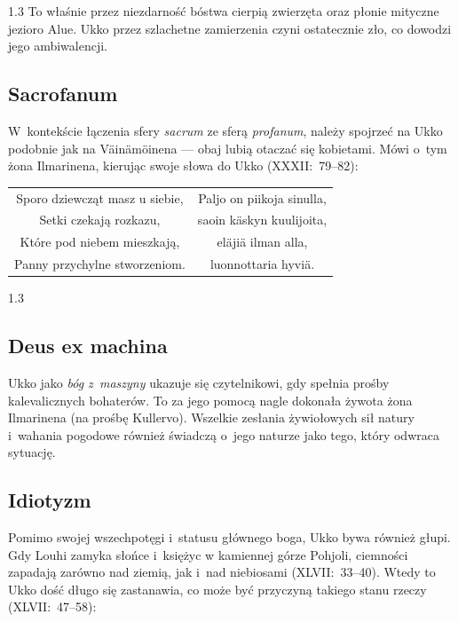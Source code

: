 \documentclass[11pt,a4paper,twoside]{report}
\begin{document}
\begin{spacing}{1.3}
To właśnie przez niezdarność bóstwa cierpią zwierzęta oraz płonie mityczne jezioro Alue. Ukko przez szlachetne zamierzenia czyni ostatecznie zło, co dowodzi jego ambiwalencji.

\vspace*{0.5\baselineskip}
\subsection*{Sacrofanum}

W~kontekście łączenia sfery \emph{sacrum} ze sferą \emph{profanum}, należy spojrzeć na Ukko podobnie jak na Väinämöinena --- obaj lubią otaczać się kobietami. Mówi o~tym żona Ilmarinena, kierując swoje słowa do Ukko (XXXII:~79--82):
\end{spacing}
{\centering
\small
\begin{longtable}{c c}
Sporo dziewcząt masz u siebie, & Paljo on piikoja sinulla, \\
Setki czekają rozkazu, & saoin käskyn kuulijoita, \\
Które pod niebem mieszkają, & eläjiä ilman alla, \\
Panny przychylne stworzeniom. & luonnottaria hyviä. \\
\end{longtable}
}
\begin{spacing}{1.3}

\vspace*{0.5\baselineskip}
\subsection*{Deus ex machina}

Ukko jako \emph{bóg z~maszyny} ukazuje się czytelnikowi, gdy spełnia prośby kalevalicznych bohaterów. To za jego pomocą nagle dokonała żywota żona Ilmarinena (na prośbę Kullervo). Wszelkie zesłania żywiołowych sił natury i~wahania pogodowe również świadczą o~jego naturze jako tego, który odwraca sytuację.

\vspace*{0.5\baselineskip}
\subsection*{Idiotyzm}

Pomimo swojej wszechpotęgi i~statusu głównego boga, Ukko bywa również głupi. Gdy Louhi zamyka słońce i~księżyc w kamiennej górze Pohjoli, ciemności zapadają zarówno nad ziemią, jak i~nad niebiosami (XLVII:~33--40). Wtedy to Ukko dość długo się zastanawia, co może być przyczyną takiego stanu rzeczy (XLVII:~47--58):
\end{spacing}
\end{document}
